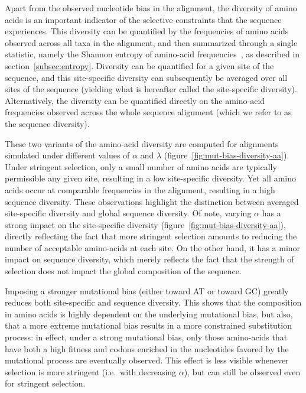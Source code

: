 Apart from the observed nucleotide bias in the alignment, the diversity of amino acids is an important indicator of the selective constraints that the sequence experiences.
This diversity can be quantified by the frequencies of amino acids observed across all taxa in the alignment, and then summarized through a single statistic, namely the Shannon entropy of amino-acid frequencies~\citep{Goldstein2017}, as described in section~\ref{subsec:entropy}.
Diversity can be quantified for a given site of the sequence, and this site-specific diversity can subsequently be averaged over all sites of the sequence (yielding what is hereafter called the site-specific diversity).
Alternatively, the diversity can be quantified directly on the amino-acid frequencies observed across the whole sequence alignment (which we refer to as the sequence diversity).

These two variants of the amino-acid diversity are computed for alignments simulated under different values of $\alpha$ and $\lambda$ (figure~\ref{fig:mut-bias-diversity-aa}).
Under stringent selection, only a small number of amino acids are typically permissible any given site, resulting in a low site-specific diversity.
Yet all amino acids occur at comparable frequencies in the alignment, resulting in a high sequence diversity.
These observations highlight the distinction between averaged site-specific diversity and global sequence diversity.
Of note, varying $\alpha$ has a strong impact on the site-specific diversity (figure~\ref{fig:mut-bias-diversity-aa}), directly reflecting the fact that more stringent selection amounts to reducing the number of acceptable amino-acids at each site.
On the other hand, it has a minor impact on sequence diversity, which merely reflects the fact that the strength of selection does not impact the global composition of the sequence.

Imposing a stronger mutational bias (either toward AT or toward GC) greatly reduces both site-specific and sequence diversity.
This shows that the composition in amino acids is highly dependent on the underlying mutational bias, but also, that a more extreme mutational bias results in a more constrained \gls{substitution} process: in effect, under a strong mutational bias, only those amino-acids that have both a high fitness and \glspl{codon} enriched in the nucleotides favored by the mutational process are eventually observed.
This effect is less visible whenever selection is more stringent (i.e.~with decreasing $\alpha$), but can still be observed even for stringent selection.

